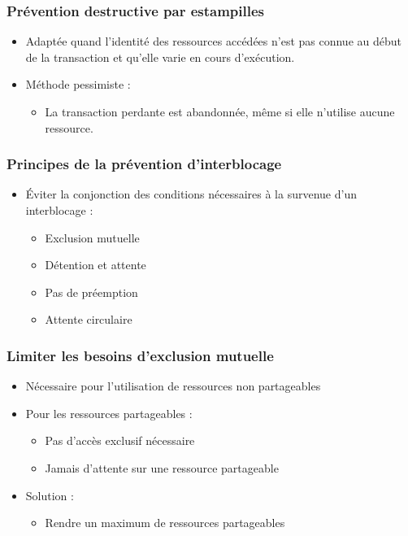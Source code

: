 \begin{frame}
\frametitle{Prévention destructive par estampilles}
\begin{itemize}
\item Adaptée quand l'identité des ressources accédées n'est pas connue au début de la transaction et qu'elle varie en cours d’exécution.
\item Méthode pessimiste :
\begin{itemize}
\item La transaction perdante est abandonnée, même si elle n'utilise aucune ressource.
\end{itemize}
\end{itemize}
\end{frame}

\begin{frame}
\frametitle{Principes de la prévention d’interblocage}
\begin{itemize}
\item Éviter la conjonction des conditions nécessaires à la survenue d’un interblocage :
\begin{itemize}
\item Exclusion mutuelle
\item Détention et attente
\item Pas de préemption
\item Attente circulaire
\end{itemize}
\end{itemize}
\end{frame}

\begin{frame}
\frametitle{Limiter les besoins d’exclusion mutuelle}
\begin{itemize}
\item Nécessaire pour l’utilisation de ressources non partageables
\item Pour les ressources partageables :
\begin{itemize}
\item Pas d’accès exclusif nécessaire
\item Jamais d’attente sur une ressource partageable
\end{itemize}
\item Solution :
\begin{itemize}
\item Rendre un maximum de ressources partageables
\end{itemize}
\end{itemize}
\end{frame}


